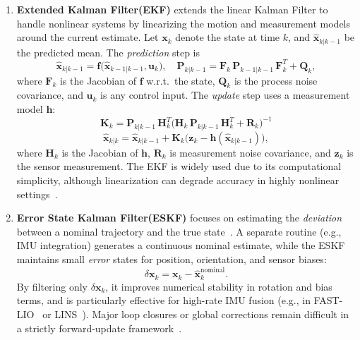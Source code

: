 \begin{enumerate}
    \item \textbf{Extended Kalman Filter(EKF) }extends the linear Kalman Filter \cite{kalman1960new} to handle nonlinear systems by linearizing the motion and measurement models around the current estimate.  Let $\mathbf{x}_k$ denote the state at time $k$, and $\hat{\mathbf{x}}_{k|k-1}$ be the predicted mean. The \emph{prediction} step is
        \begin{equation}
        \hat{\mathbf{x}}_{k|k-1} = \mathbf{f}\bigl(\hat{\mathbf{x}}_{k-1|k-1}, \mathbf{u}_{k}\bigr), \quad
        \mathbf{P}_{k|k-1} = \mathbf{F}_k \,\mathbf{P}_{k-1|k-1}\,\mathbf{F}_k^T + \mathbf{Q}_k,
        \end{equation}
        where $\mathbf{F}_k$ is the Jacobian of $\mathbf{f}$ w.r.t.\ the state, $\mathbf{Q}_k$ is the process noise covariance, and $\mathbf{u}_k$ is any control input. The \emph{update} step uses a measurement model $\mathbf{h}$:
        \begin{equation}
        \mathbf{K}_k = \mathbf{P}_{k|k-1} \,\mathbf{H}_k^T 
        \bigl(\mathbf{H}_k\,\mathbf{P}_{k|k-1}\,\mathbf{H}_k^T + \mathbf{R}_k\bigr)^{-1}
        \end{equation}
        \begin{equation}
            \hat{\mathbf{x}}_{k|k} = \hat{\mathbf{x}}_{k|k-1} + \mathbf{K}_k 
            \bigl(\mathbf{z}_k - \mathbf{h}(\hat{\mathbf{x}}_{k|k-1})\bigr),
        \end{equation}
        where $\mathbf{H}_k$ is the Jacobian of $\mathbf{h}$, $\mathbf{R}_k$ is measurement noise covariance, and $\mathbf{z}_k$ is the sensor measurement. The EKF is widely used due to its computational simplicity, although linearization can degrade accuracy in highly nonlinear settings~\cite{thrun2005probabilistic}.
        
    \item \textbf{Error State Kalman Filter(ESKF)} focuses on estimating the \emph{deviation} between a nominal trajectory and the true state~\cite{mourikis2007multi}. A separate routine (e.g., IMU integration) generates a continuous nominal estimate, while the ESKF maintains small \emph{error} states for position, orientation, and sensor biases:
\begin{equation}
\delta \mathbf{x}_k = \mathbf{x}_k - \hat{\mathbf{x}}_{k}^{\text{nominal}}.
\end{equation}
By filtering only $\delta \mathbf{x}_k$, it improves numerical stability in rotation and bias terms, and is particularly effective for high-rate IMU fusion (e.g., in FAST-LIO~\cite{xuFastLIO2021} or LINS~\cite{lins}). Major loop closures or global corrections remain difficult in a strictly forward-update framework~\cite{cadena2016past}.


\end{enumerate}
